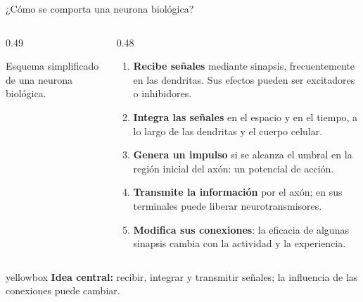 \documentclass[10pt,aspectratio=169,xcolor={dvipsnames}]{beamer}
\newenvironment{caja}[1][lgraybox]{\begin{beamercolorbox}[sep=0.7em,wd=\linewidth]{#1}}{\end{beamercolorbox}}
\begin{document}
\begin{frame}{¿Cómo se comporta una neurona biológica?}
    \begin{columns}[c]
        \begin{column}{0.49\textwidth}
            \centering
            \resizebox{\linewidth}{!}{}
            \par\smallskip
            {\scriptsize Esquema simplificado de una neurona biológica.}
        \end{column}
        \begin{column}{0.48\textwidth}
            \small
            \begin{enumerate}
                \setlength{\itemsep}{2pt}
                \item \textbf{Recibe señales} mediante sinapsis, frecuentemente en las dendritas. Sus efectos pueden ser excitadores o inhibidores.
                \item \textbf{Integra las señales} en el espacio y en el tiempo, a lo largo de las dendritas y el cuerpo celular.
                \item \textbf{Genera un impulso} si se alcanza el umbral en la región inicial del axón: un potencial de acción.
                \item \textbf{Transmite la información} por el axón; en sus terminales puede liberar neurotransmisores.
                \item \textbf{Modifica sus conexiones}: la eficacia de algunas sinapsis cambia con la actividad y la experiencia.
            \end{enumerate}
        \end{column}
    \end{columns}
    \vspace{2mm}
    \begin{caja}[yellowbox]
        \small \textbf{Idea central:} recibir, integrar y transmitir señales; la influencia de las conexiones puede cambiar.
    \end{caja}
\end{frame}
\end{document}

